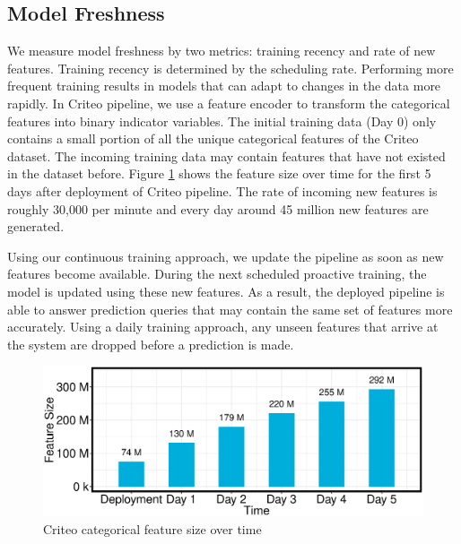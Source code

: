 \subsection{Model Freshness}
We measure model freshness by two metrics: training recency and rate of new features.
Training recency is determined by the scheduling rate.
Performing more frequent training results in models that can adapt to changes in the data more rapidly.
In Criteo pipeline, we use a feature encoder to transform the categorical features into binary indicator variables.
The initial training data (Day 0) only contains a small portion of all the unique categorical features of the Criteo dataset.
The incoming training data may contain features that have not existed in the dataset before.
Figure \ref{fig:criteo-feature-discovery} shows the feature size over time for the first 5 days after deployment of Criteo pipeline.
The rate of incoming new features is roughly 30,000 per minute and every day around 45 million new features are generated.

Using our continuous training approach, we update the pipeline as soon as new features become available.
During the next scheduled proactive training, the model is updated using these new features.
As a result, the deployed pipeline is able to answer prediction queries that may contain the same set of features more accurately.
Using a daily training approach, any unseen features that arrive at the system are dropped before a prediction is made.

\begin{figure}[H]
\includegraphics[width=\columnwidth]{../images/experiment-results/feature-discovery-experiment.eps}
\caption{Criteo categorical feature size over time}
\label{fig:criteo-feature-discovery}
\end{figure}



